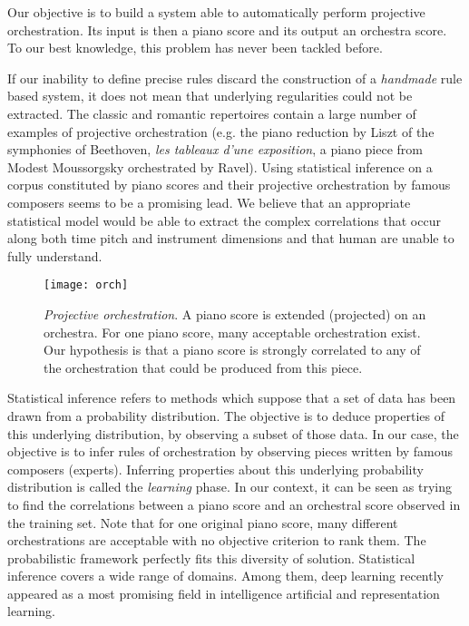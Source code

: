 \documentclass[letterpaper]{article}
\begin{document}
Our objective is to build a system able to automatically perform projective orchestration. Its input is then a piano score and its output an orchestra score. To our best knowledge, this problem has never been tackled before.

If our inability to define precise rules discard the construction of a \textit{handmade} rule based system, it does not mean that underlying regularities could not be extracted. The classic and romantic repertoires contain a large number of examples of projective orchestration (e.g. the piano reduction by Liszt of the symphonies of Beethoven, \textit{les tableaux d'une exposition}, a piano piece from Modest Moussorgsky orchestrated by Ravel). Using statistical inference on a corpus constituted by piano scores and their projective orchestration by famous composers seems to be a promising lead. We believe that an appropriate statistical model would be able to extract the complex correlations that  occur along both time pitch and instrument dimensions and that human are unable to fully understand.


\begin{figure}
\centering
\texttt{[image: orch]}
\caption{\textit{Projective orchestration}. A piano score is extended (projected) on an orchestra. For one piano score, many acceptable orchestration exist. Our hypothesis is that a piano score is strongly correlated to any of the orchestration that could be produced from this piece.}
\label{fig:orch}
\end{figure}

Statistical inference refers to methods which suppose that a set of data has been drawn from a probability distribution. The objective is to deduce properties of this underlying distribution, by observing a subset of those data. In our case, the objective is to infer rules of orchestration by observing pieces written by famous composers (experts). Inferring properties about this underlying probability distribution is called the \textit{learning} phase.
In our context, it can be seen as trying to find the correlations between a piano score and an orchestral score observed in the training set. Note that for one original piano score, many different orchestrations are acceptable with no objective criterion to rank them. The probabilistic framework perfectly fits this diversity of solution.
Statistical inference covers a wide range of domains. Among them, deep learning recently appeared as a most promising field in intelligence artificial and representation learning.
\end{document}
